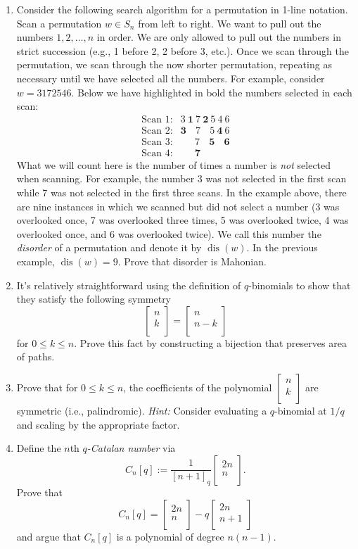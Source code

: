 \documentclass[11pt]{article}
\theoremstyle{definition}
\DeclareMathOperator{\dis}{dis}
\newcommand{\qbinom}[2]{
  \displaystyle \left[\begin{matrix}#1  \\#2  \\ \end{matrix}\right]}
\begin{document}
\begin{enumerate}
\item Consider the following search algorithm for a permutation in 1-line notation.  Scan a permutation $w\in S_n$ from left to right.  We want to pull out the numbers $1,2,\ldots,n$ in order.  We are only allowed to pull out the numbers in strict succession (e.g., 1 before 2, 2 before 3, etc.).  Once we scan through the permutation, we scan through the now shorter permutation, repeating as necessary until we have selected all the numbers.  For example, consider $w=3172546$. Below we have highlighted in bold the numbers selected in each scan:
\begin{eqnarray*}
\text{Scan 1:}& 3\ \mathbf{1}\ 7\ \mathbf{2}\ 5\ 4\ 6\\
\text{Scan 2:}& \mathbf{3}\ \phantom{1}\ 7\ \phantom{2}\ 5\ \mathbf{4}\ 6\\
\text{Scan 3:}& \phantom{3}\ \phantom{1}\ 7\ \phantom{2}\ \mathbf{5}\ \phantom{4}\ \mathbf{6}\\
\text{Scan 4:}& \phantom{3}\ \phantom{1}\ \mathbf{7}\ \phantom{2}\ \phantom{5}\ \phantom{4}\ \phantom{6}
\end{eqnarray*}
What we will count here is the number of times a number is \emph{not} selected when scanning.  For example, the number 3 was not selected in the first scan while 7 was not selected in the first three scans. In the example above, there are nine instances in which we scanned but did not select a number (3 was overlooked once, 7 was overlooked three times, 5 was overlooked twice, 4 was overlooked once, and 6 was overlooked twice).  We call this number the \emph{disorder} of a permutation and denote it by $\dis(w)$. In the previous example, $\dis(w)=9$. Prove that disorder is Mahonian.  

\item It's relatively straightforward using the definition of $q$-binomials to show that they satisfy the following symmetry
\[
\qbinom{n}{k}=\qbinom{n}{n-k}
\]
for $0\leq k\leq n$.  Prove this fact by constructing a bijection that preserves area of paths.

\item Prove that for $0\leq k\leq n$, the coefficients of the polynomial $\qbinom{n}{k}$ are symmetric (i.e., palindromic). \emph{Hint:} Consider evaluating a $q$-binomial at $1/q$ and scaling by the appropriate factor.

\item Define the $n$th \emph{$q$-Catalan number} via
\[
C_n[q]:=\frac{1}{[n+1]_q}\qbinom{2n}{n}.
\]
Prove that
\[
C_n[q]=\qbinom{2n}{n}-q\qbinom{2n}{n+1}
\]
and argue that $C_n[q]$ is a polynomial of degree $n(n-1)$.


\end{enumerate}
\end{document}
